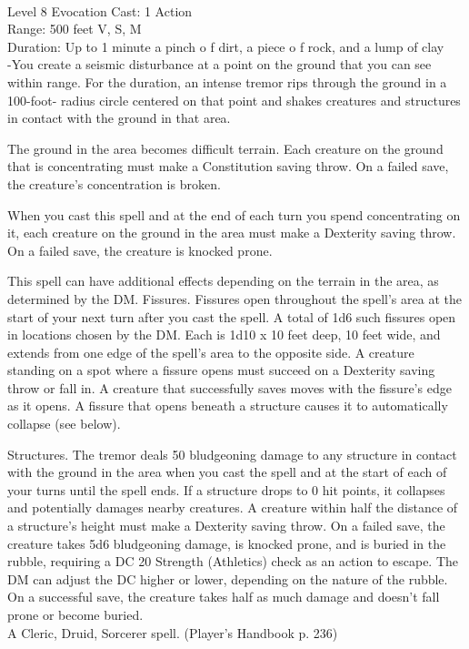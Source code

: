 \documentclass[10pt,twocolumn]{report}
\begin{document}
 \\
Level 8 \quad Evocation \quad Cast: 1 Action\\
Range: 500 feet \quad V, S, M\\
Duration: Up to 1 minute \quad a pinch o f dirt, a piece o f rock, and a lump of clay\\
-You create a seismic disturbance at a point on the ground that you can see within range. 
For the duration, an intense tremor rips through the ground in a 100-foot- radius circle centered on that point and shakes creatures and structures in contact with the ground in that area. 

The ground in the area becomes difficult terrain. Each creature on the ground that is concentrating must make a Constitution saving throw. On a failed save, the creature’s concentration is broken. 

When you cast this spell and at the end of each turn you spend concentrating on it, each creature on the ground in the area must make a Dexterity saving throw. On a failed save, the creature is knocked prone. 

This spell can have additional effects depending on the terrain in the area, as determined by the DM. 
Fissures. 
Fissures open throughout the spell’s area at the start of your next turn after you cast the spell. A total of 1d6 such fissures open in locations chosen by the DM. Each is 1d10 x 10 feet deep, 10 feet wide, and extends from one edge of the spell’s area to the opposite side. A creature standing on a spot where a fissure opens must succeed on a Dexterity saving throw or fall in. A creature that successfully saves moves with the fissure’s edge as it opens. 
A fissure that opens beneath a structure causes it to automatically collapse (see below). 

Structures. 
The tremor deals 50 bludgeoning damage to any structure in contact with the ground in the area when you cast the spell and at the start of each of your turns until the spell ends. If a structure drops to 0 hit points, it collapses and potentially damages nearby creatures. A creature within half the distance of a structure’s height must make a Dexterity saving throw. On a failed save, the creature takes 5d6 bludgeoning damage, is knocked prone, and is buried in the rubble, requiring a DC 20 Strength (Athletics) check as an action to escape. The DM can adjust the DC higher or lower, depending on the nature of the rubble. On a successful save, the creature takes half as much damage and doesn’t fall prone or become buried.\\
A Cleric, Druid, Sorcerer spell. (Player's Handbook p. 236) \\
\end{document}
